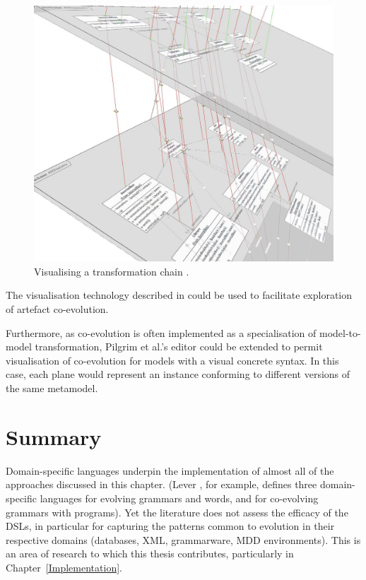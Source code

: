 \begin{figure}[htbp]
  \begin{center}
    \leavevmode
    \includegraphics[scale=0.25]{3.LiteratureReview/transformation-chain.png}
  \end{center}
  \caption{Visualising a transformation chain \cite{pilgrim08constructing}.}
  \label{fig:transformation-chains}
\end{figure}

The visualisation technology described in \cite{pilgrim08constructing} could be used to facilitate exploration of artefact co-evolution.

Furthermore, as co-evolution is often implemented as a specialisation of model-to-model transformation, Pilgrim et al.'s editor could be extended to permit visualisation of co-evolution for models with a visual concrete syntax. In this case, each plane would represent an instance conforming to different versions of the same metamodel.


\section{Summary}
Domain-specific languages underpin the implementation of almost all of the approaches discussed in this chapter. (Lever \cite{pizka07automating}, for example, defines three domain-specific languages for evolving grammars and words, and for co-evolving grammars with programs). Yet the literature does not assess the efficacy of the DSLs, in particular for capturing the patterns common to evolution in their respective domains (databases, XML, grammarware, MDD environments). This is an area of research to which this thesis contributes, particularly in Chapter~\ref{Implementation}.

